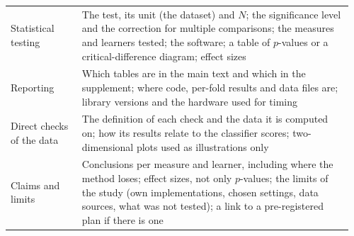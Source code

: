 \begin{table}[p]
\begin{tabular}{@{}>{\raggedright\arraybackslash}p{0.2\linewidth}>{\raggedright\arraybackslash}p{0.76\linewidth}@{}}
    Statistical testing & The test, its unit (the dataset) and $N$; the significance level and the correction for multiple comparisons; the measures and learners tested; the software; a table of $p$-values or a critical-difference diagram; effect sizes\\
    Reporting & Which tables are in the main text and which in the supplement; where code, per-fold results and data files are; library versions and the hardware used for timing\\
    Direct checks of the data & The definition of each check and the data it is computed on; how its results relate to the classifier scores; two-dimensional plots used as illustrations only\\
    Claims and limits & Conclusions per measure and learner, including where the method loses; effect sizes, not only $p$-values; the limits of the study (own implementations, chosen settings, data sources, what was not tested); a link to a pre-registered plan if there is one\\
    \bottomrule
  \end{tabular}
\end{table}
